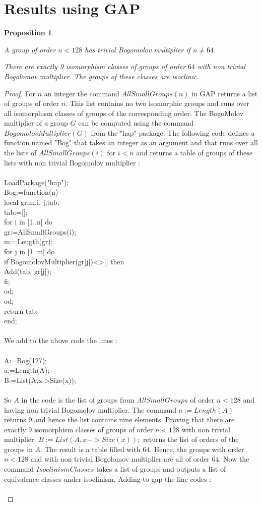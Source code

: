 \documentclass[12pt, reqno]{amsart}
\newtheorem{proposition}[theorem]{Proposition}
\begin{document}
\section{Results using GAP}
\begin{proposition}\label{prop1}
\item[1)] A group of order $n<128$ has trivial Bogomolov multiplier if $n\neq 64$.
\item[2)] There are exactly 9 isomorphism classes of groups of order $64$ with non trivial Bogolomov multiplier. The groups of these classes are isoclinic.
\end{proposition}
\begin{proof}
For $n$ an integer the command $AllSmallGroups(n)$ in GAP returns a list of groups of order $n$. This list contains no two isomorphic groups and runs over all isomorphism classes of groups of the corresponding order. The BogoMolov multiplier of a group $G$ can be computed using the command $BogomolovMultiplier(G)$ from the "hap" package. The following code defines a function named "Bog" that takes an integer as an argument and that runs over all the lists of $AllSmallGroups(i)$ for $i<n$ and returns a table of groups of these lists with non trivial Bogomolov multiplier :\\\\
LoadPackage("hap");\\
Bog:=function(n)\\
local gr,m,i, j,tab;\\
tab:=[\:];\\
for i in [1..n] do\\ 
gr:=AllSmallGroups(i);\\
m:=Length(gr);\\
for j in [1..m] do\\
if BogomolovMultiplier(gr[j])<>[\:] then\\
Add(tab, gr[j]);\\
fi;\\
od;\\
od;\\
return tab;\\
end;\\\\
We add to the above code the lines :\\\\
A:=Bog(127);\\
a:=Length(A);\\
B:=List(A,x->Size(x));\\\\
So $A$ in the code is the list of groups from $AllSmallGroups$ of order $n<128$ and having non trivial Bogomolov multiplier. The command $a:=Length(A)$ returns $9$ and hence the list contains nine elements. Proving that there are exactly $9$ isomorphism classes of groups of order $n<128$ with non trivial multiplier. $B:=List(A,x->Size(x));$ returns the list of orders of the groups in $A$. The result is a table filled with $64$. Hence, the groups with order $n<128$ and with non trivial Bogolomov multiplier are all of order $64$. Now the command $IsoclinismClasses$ takes a list of groups and outputs a list of equivalence classes under isoclinism. Adding to gap the line codes :\\\\

\end{proof}
\end{document}
